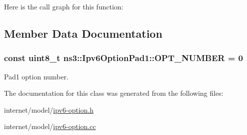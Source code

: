 Here is the call graph for this function\+:




\subsection{Member Data Documentation}
\subsubsection[{\texorpdfstring{O\+P\+T\+\_\+\+N\+U\+M\+B\+ER}{OPT_NUMBER}}]{\setlength{\rightskip}{0pt plus 5cm}const uint8\+\_\+t ns3\+::\+Ipv6\+Option\+Pad1\+::\+O\+P\+T\+\_\+\+N\+U\+M\+B\+ER = 0\hspace{0.3cm}{\ttfamily [static]}}\hypertarget{classns3_1_1Ipv6OptionPad1_ab46b4f1c53296ff607dfd7f60ad3bd18}{}\label{classns3_1_1Ipv6OptionPad1_ab46b4f1c53296ff607dfd7f60ad3bd18}


Pad1 option number. 



The documentation for this class was generated from the following files\+:\begin{DoxyCompactItemize}
\item 
internet/model/\hyperlink{ipv6-option_8h}{ipv6-\/option.\+h}\item 
internet/model/\hyperlink{ipv6-option_8cc}{ipv6-\/option.\+cc}\end{DoxyCompactItemize}
